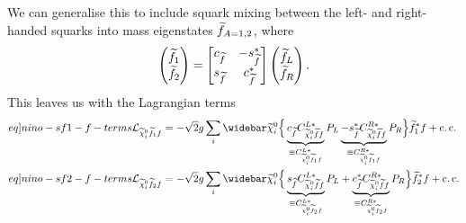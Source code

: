 \documentclass[english, notitlepage]{article}
\begin{document}
            We can generalise this to include squark mixing between the left- and right-handed squarks into mass eigenstates \(\widetilde{f}_{A=1,2}\), where
            \begin{align}
                \begin{pmatrix}
                    \widetilde{f}_1 \\
                    \widetilde{f}_2
                \end{pmatrix}
                =
                \begin{bmatrix}
                    c_{\widetilde{f}} & -s_{\widetilde{f}}^* \\
                    s_{\widetilde{f}} & c_{\widetilde{f}}^*
                \end{bmatrix} \begin{pmatrix}
                                  \widetilde{f}_L \\
                                  \widetilde{f}_R
                              \end{pmatrix}.
            \end{align}
            This leaves us with the Lagrangian terms
            \begin{subequations}
                \begin{align}
                    \label[eq]{nino-sf1-f-terms}
                    \L_{\nino[i] \wtilde{f}_1 f} = -\sqrt{2} g \sum_{i} \wbar{\wtilde{\chi}}^0_i & \Big\{ \underbrace{c_{\wtilde{f}} C_{\nino[i] \wtilde{f} f}^{L*}}_{\equiv C_{\nino[i] \wtilde{f}_1 f}^{L*}} P_L \underbrace{- s_{\wtilde{f}}^* C_{\nino[i] \wtilde{f} f}^{R*}}_{\equiv C_{\nino[i] \wtilde{f}_1 f}^{R*}} P_R \Big\} \wtilde{f}_1^* f + \cc \\
                    \label[eq]{nino-sf2-f-terms}
                    \L_{\nino[i] \wtilde{f}_2 f} = -\sqrt{2} g \sum_{i} \wbar{\wtilde{\chi}}^0_i & \Big\{ \underbrace{s_{\wtilde{f}} C_{\nino[i] \wtilde{f} f}^{L*}}_{\equiv C_{\nino[i] \wtilde{f}_2 f}^{L*}} P_L + \underbrace{c_{\wtilde{f}}^* C_{\nino[i] \wtilde{f} f}^{R*}}_{\equiv C_{\nino[i] \wtilde{f}_2 f}^{R*}} P_R \Big\} \wtilde{f}_2^* f + \cc
                \end{align}
            \end{subequations}
\end{document}
